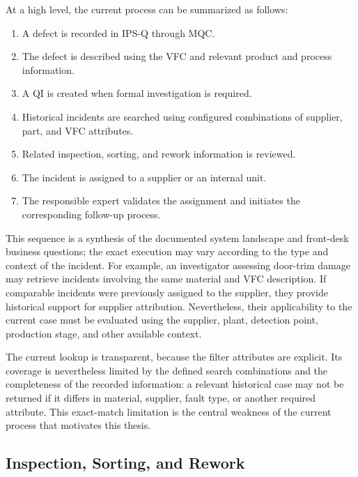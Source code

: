 At a high level, the current process can be summarized as follows:

\begin{enumerate}
  \item A defect is recorded in IPS-Q through MQC.
  \item The defect is described using the VFC and relevant product and
    process information.
  \item A QI is created when formal investigation is required.
  \item Historical incidents are searched using configured combinations of
    supplier, part, and VFC attributes.
  \item Related inspection, sorting, and rework information is reviewed.
  \item The incident is assigned to a supplier or an internal unit.
  \item The responsible expert validates the assignment and initiates the
    corresponding follow-up process.
\end{enumerate}

This sequence is a synthesis of the documented system landscape and
front-desk business questions; the exact execution may vary according to
the type and context of the incident. For example, an investigator
assessing door-trim damage may retrieve incidents involving the same
material and VFC description. If comparable incidents were previously
assigned to the supplier, they provide historical support for supplier
attribution. Nevertheless, their applicability to the current case must be
evaluated using the supplier, plant, detection point, production stage,
and other available context.

The current lookup is transparent, because the filter attributes are
explicit. Its coverage is nevertheless limited by the defined search
combinations and the completeness of the recorded information: a relevant
historical case may not be returned if it differs in material, supplier,
fault type, or another required attribute. This exact-match limitation is
the central weakness of the current process that motivates this thesis.

\subsection{Inspection, Sorting, and Rework}\label{sec:fund_bmw_isr}


